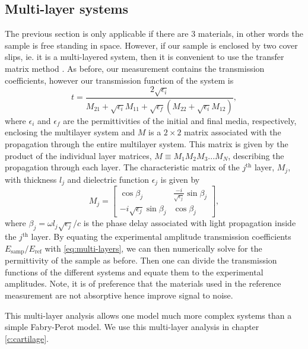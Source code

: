 \subsection{Multi-layer systems} \label{sec:multi-layers}
The previous section is only applicable if there are 3 materials, in other words the sample is free standing in space. However, if our sample is enclosed by two cover slips, ie. it is a multi-layered system, then it is convenient to use the transfer matrix method \cite{Ulbricht2011CarrierSpectroscopy}. As before, our measurement contains the transmission coefficients, however our transmission function of the system is \cite{Ulbricht2011CarrierSpectroscopy, multi_layers}
\begin{equation}
t=\frac{2 \sqrt{\epsilon_i}}{M_{21} + \sqrt{\epsilon_i} M_{11} + \sqrt{\epsilon_{f}}(M_{22}+\sqrt{\epsilon_i} M_{12})},
\label{eq:multi-layers}
\end{equation}
where $\epsilon_i$ and $\epsilon_{f}$ are the permittivities of the initial and final media, respectively, enclosing the multilayer system and $M$ is a $2\times2$ matrix associated with the propagation through the entire multilayer system. This matrix is given by the product of the individual layer matrices, $M\equiv M_1M_2M_3...M_N$, describing the propagation through each layer. The characteristic matrix of the $j^{\text{th}}$ layer, $M_j$, with thickness $l_j$ and dielectric function $\epsilon_j$ is given by
\begin{equation}
M_j = \left[ \begin{array}{cc} \cos\beta_j & \frac{-i}{\sqrt{\epsilon_j}}\sin\beta_j \\ -i\sqrt{\epsilon_j}\sin\beta_j & \cos\beta_j \end{array}\right],
\end{equation}
where $\beta_j=\omega l_j \sqrt{\epsilon_j}/c$ is the phase delay associated with light propagation inside the $j^{\text{th}}$ layer. By equating the experimental amplitude transmission coefficients $E_{\mbox{samp}}/E_{\mbox{ref}}$ with \eqref{eq:multi-layers}, we can then numerically solve for the permittivity of the sample as before. Then one can divide the transmission functions of the different systems and equate them to the experimental amplitudes. Note, it is of preference that the materials used in the reference measurement are not absorptive hence improve signal to noise.  

This multi-layer analysis allows one model much more complex systems than a simple Fabry-Perot model. We use this multi-layer analysis in chapter \ref{c:cartilage}.



